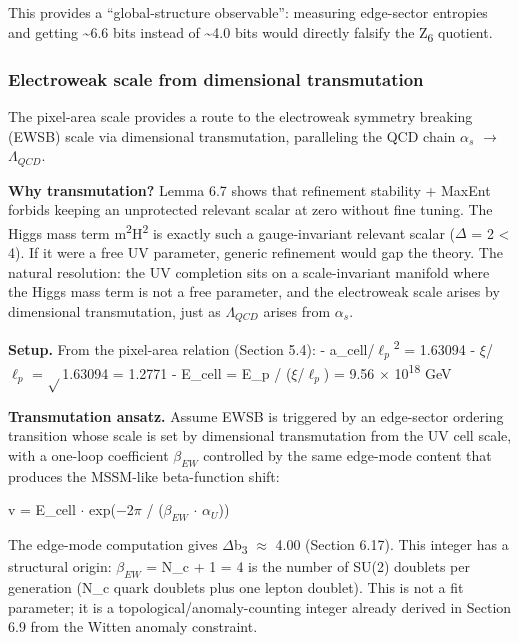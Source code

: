 \documentclass[11pt,a4paper]{article}
\theoremstyle{remark}
\begin{document}
This provides a ``global-structure observable'': measuring edge-sector
entropies and getting \textasciitilde6.6 bits instead of \textasciitilde4.0 bits would
directly falsify the Z\textsubscript{6} quotient.

\subsubsection{Electroweak scale from dimensional transmutation}\label{electroweak-scale-from-dimensional-transmutation}

The pixel-area scale provides a route to the electroweak symmetry breaking
(EWSB) scale via dimensional transmutation, paralleling the QCD chain
$\alpha_s$ \ensuremath{\to} $\Lambda_{QCD}$.

\textbf{Why transmutation?} Lemma 6.7 shows that refinement stability + MaxEnt forbids
keeping an unprotected relevant scalar at zero without fine tuning. The Higgs
mass term m\textsuperscript{2}\textbar H\textbar\textsuperscript{2} is exactly such a gauge-invariant relevant scalar (\ensuremath{\Delta} = 2 \textless{} 4).
If it were a free UV parameter, generic refinement would gap the theory.
The natural resolution: the UV completion sits on a scale-invariant manifold
where the Higgs mass term is not a free parameter, and the electroweak scale
arises by dimensional transmutation, just as $\Lambda_{QCD}$ arises from $\alpha_s$.

\textbf{Setup.} From the pixel-area relation (Section 5.4):
- a\_cell/$\ell_p$\textsuperscript{2} = 1.63094
- \ensuremath{\xi}/$\ell_p$ = \ensuremath{\sqrt{}}1.63094 = 1.2771
- E\_cell = E\_p / (\ensuremath{\xi}/$\ell_p$) = 9.56 \ensuremath{\times} 10\textsuperscript{18} GeV

\textbf{Transmutation ansatz.} Assume EWSB is triggered by an edge-sector ordering transition whose scale is set by dimensional transmutation from the UV cell scale, with a one-loop coefficient $\beta_{EW}$ controlled by the same edge-mode content that produces the MSSM-like beta-function shift:

v = E\_cell \ensuremath{\cdot} exp(\ensuremath{-}2\ensuremath{\pi} / ($\beta_{EW}$ \ensuremath{\cdot} $\alpha_U$))

The edge-mode computation gives \ensuremath{\Delta}b\textsubscript{3} \ensuremath{\approx} 4.00 (Section 6.17). This integer has a structural origin: $\beta_{EW}$ = N\_c + 1 = 4 is the number of SU(2) doublets per generation (N\_c quark doublets plus one lepton doublet). This is not a fit parameter; it is a topological/anomaly-counting integer already derived in Section 6.9 from the Witten anomaly constraint.
\end{document}
